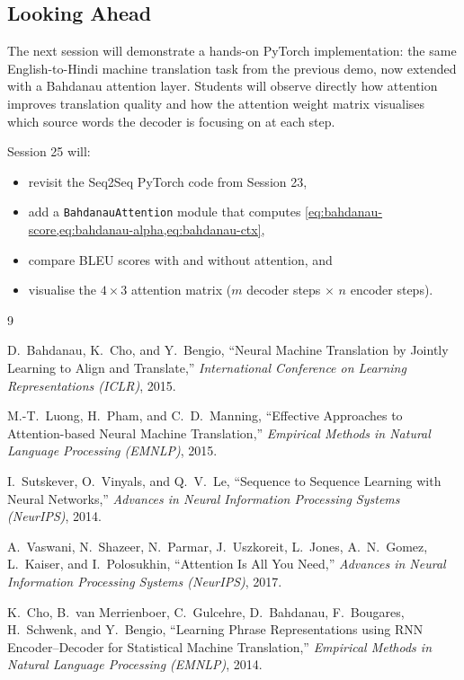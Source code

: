 \documentclass[12pt,a4paper]{article}
\begin{document}
\subsection*{Looking Ahead}

The next session will demonstrate a hands-on PyTorch implementation:
the same English-to-Hindi machine translation task from the previous
demo, now extended with a Bahdanau attention layer.  Students will
observe directly how attention improves translation quality and how
the attention weight matrix visualises which source words the decoder
is focusing on at each step.

\begin{example}[title=What to Expect in Session 25]
  Session 25 will:
  \begin{itemize}
    \item revisit the Seq2Seq PyTorch code from Session 23,
    \item add a \texttt{BahdanauAttention} module that computes
          \cref{eq:bahdanau-score,eq:bahdanau-alpha,eq:bahdanau-ctx},
    \item compare BLEU scores with and without attention, and
    \item visualise the $4 \times 3$ attention matrix
          ($m$ decoder steps $\times$ $n$ encoder steps).
  \end{itemize}
\end{example}

\newpage
\begin{thebibliography}{9}

  D.\ Bahdanau, K.\ Cho, and Y.\ Bengio,
  ``Neural Machine Translation by Jointly Learning to Align and
    Translate,''
  \textit{International Conference on Learning Representations (ICLR)},
  2015.

  M.-T.\ Luong, H.\ Pham, and C.\ D.\ Manning,
  ``Effective Approaches to Attention-based Neural Machine
    Translation,''
  \textit{Empirical Methods in Natural Language Processing (EMNLP)},
  2015.

  I.\ Sutskever, O.\ Vinyals, and Q.\ V.\ Le,
  ``Sequence to Sequence Learning with Neural Networks,''
  \textit{Advances in Neural Information Processing Systems (NeurIPS)},
  2014.

  A.\ Vaswani, N.\ Shazeer, N.\ Parmar, J.\ Uszkoreit, L.\ Jones,
  A.\ N.\ Gomez, L.\ Kaiser, and I.\ Polosukhin,
  ``Attention Is All You Need,''
  \textit{Advances in Neural Information Processing Systems (NeurIPS)},
  2017.

  K.\ Cho, B.\ van Merrienboer, C.\ Gulcehre, D.\ Bahdanau,
  F.\ Bougares, H.\ Schwenk, and Y.\ Bengio,
  ``Learning Phrase Representations using RNN Encoder--Decoder for
    Statistical Machine Translation,''
  \textit{Empirical Methods in Natural Language Processing (EMNLP)},
  2014.

\end{thebibliography}
\end{document}
